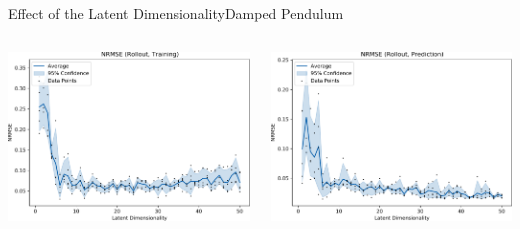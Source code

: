 \documentclass[
	aspectratio=43,
	color={accentcolor=1c},
	logo=false,
	colorframetitle=true,
]{tudabeamer}
\begin{document}
			\begin{frame}{Effect of the Latent Dimensionality}{Damped Pendulum}
				\vspace{-0.6cm}
				\begin{columns}[c]
					\begin{column}{0.5\linewidth}
						\begin{center}
							\includegraphics[width=\linewidth]{figures/experiments/pendulum-damped/latent-dim/comparison-rmse-rollout-train-normalized-mean-vs-latent-dim.pdf}
						\end{center}
					\end{column}
					\begin{column}{0.5\linewidth}
						\begin{center}
							\includegraphics[width=\linewidth]{figures/experiments/pendulum-damped/latent-dim/comparison-rmse-rollout-prediction-normalized-mean-vs-latent-dim.pdf}
						\end{center}
					\end{column}
				\end{columns}


\end{frame}
\end{document}
